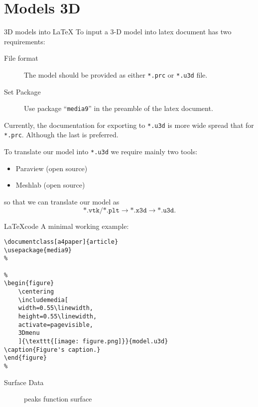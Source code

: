 \section{Models 3D}

\begin{frame}{3D models into \LaTeX}
%
\pause
To input a 3-D model into latex document has two requirements:
%
\begin{description}
	\item[File format] The model should be provided as either \texttt{*.prc} or \texttt{*.u3d} file.
	\item[Set Package] Use package  ``\texttt{media9}'' in the preamble of the latex document.
\end{description}
\vspace{5mm}

\pause
Currently, the documentation for exporting to \texttt{*.u3d} is more wide spread that for \texttt{*.prc}. Although the last is preferred.
\vspace{5mm}

\pause
To translate our model into \texttt{*.u3d} we require mainly two tools:
\begin{itemize}
	\item Paraview (open source)
	\item Meshlab (open source)
\end{itemize}
so that we can translate our model as
%
\begin{equation*}
	\texttt{*.vtk}/\texttt{*.plt} \rightarrow \texttt{*.x3d} \rightarrow \texttt{*.u3d}.
\end{equation*}
%
\end{frame}

\begin{frame}[fragile]{\LaTeX code}
%
A minimal working example:
%
\begin{lstlisting}[language=Tex]
\documentclass[a4paper]{article}
\usepackage{media9}
%

%
\begin{figure}
	\centering
	\includemedia[
    width=0.55\linewidth,
    height=0.55\linewidth,
    activate=pagevisible,
    3Dmenu
    ]{\texttt{[image: figure.png]}}{model.u3d}
\caption{Figure's caption.}
\end{figure}
%

\end{lstlisting}
%
\end{frame}

\begin{frame}{Surface Data}
%
\begin{figure}
\begin{center}
\end{center}
\caption{peaks function surface}
\end{figure}
%
\end{frame}

